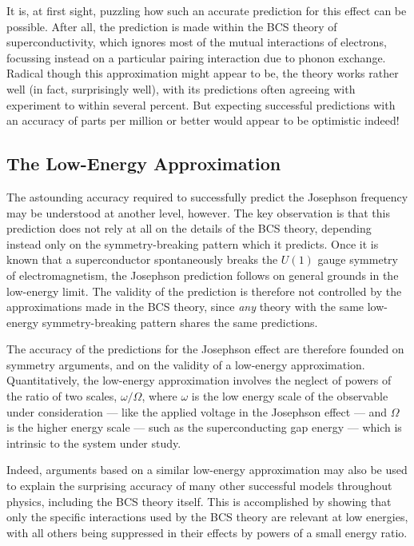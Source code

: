 It is, at first sight, puzzling how such an accurate prediction
for this effect can be possible. After all, the prediction
is made within the BCS theory of superconductivity, \cite{BCS} which
ignores most of the mutual interactions of electrons, focussing
instead on a particular pairing interaction due to phonon 
exchange. Radical though this approximation might appear
to be, the theory works rather well (in fact, surprisingly
well), with its predictions often agreeing with experiment to 
within several percent. But expecting successful predictions with an
accuracy of parts per million or better would appear to be
optimistic indeed!

\subsection{The Low-Energy Approximation}

The astounding accuracy required to successfully predict the
Josephson frequency may be understood at another level, 
however. The key observation is that this prediction does
not rely at all on the details of the BCS theory, depending
instead only on the symmetry-breaking pattern which it
predicts. Once it is known that a superconductor 
spontaneously breaks the $U(1)$ gauge symmetry of electromagnetism,
the Josephson prediction follows on general grounds in the
low-energy limit.\cite{WeinbergSC} The validity of the prediction is therefore
not controlled by the approximations made in the BCS theory,
since {\it any} theory with the same low-energy symmetry-breaking
pattern shares the same predictions. 

The accuracy of the predictions for the Josephson effect
are therefore founded on symmetry arguments, and on
the validity of a low-energy approximation. Quantitatively,
the low-energy approximation involves the neglect of powers of the
ratio of two scales, $\omega/\Omega$, where $\omega$ is
the low energy scale of the observable under 
consideration --- like the applied voltage in the 
Josephson effect --- and $\Omega$ is the higher energy 
scale --- such as the superconducting gap 
energy --- which is intrinsic to the system under study.

Indeed, arguments based on a similar
low-energy approximation may also be used to explain the
surprising accuracy of many other successful models throughout
physics, including the BCS theory itself.\cite{Polchinski,Shankar,Frohlich} 
This is accomplished by showing that only the specific 
interactions used by the BCS theory are relevant at low energies, 
with all others being suppressed in their effects by powers of a 
small energy ratio. 


